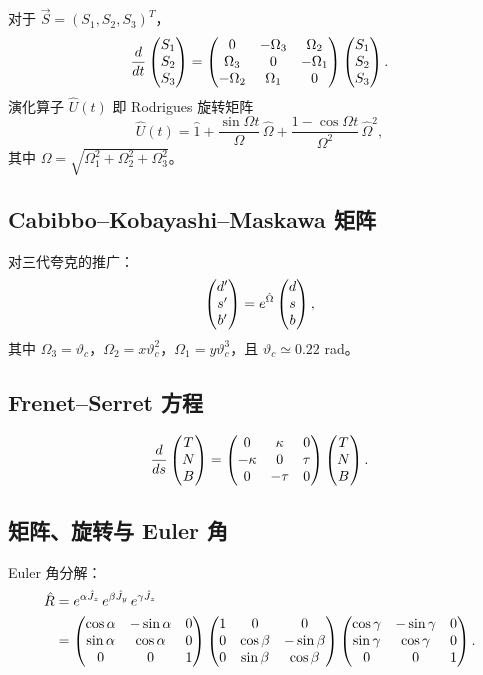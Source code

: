 对于 $\vec{S} = (S_{1},S_{2},S_{3})^{T}$，
\[
\frac{d}{dt}\begin{pmatrix}S_{1}\\S_{2}\\S_{3}\end{pmatrix}
= \begin{pmatrix}0&-\Omega_{3}&\Omega_{2}\\
        \Omega_{3}&0&-\Omega_{1}\\
       -\Omega_{2}&\Omega_{1}&0\end{pmatrix}
  \begin{pmatrix}S_{1}\\S_{2}\\S_{3}\end{pmatrix}.
\]
演化算子 $\hat{U}(t)$ 即 Rodrigues 旋转矩阵
\[
\hat{U}(t) = \hat{1} + \frac{\sin\Omega t}{\Omega}\,\hat{\Omega}
+ \frac{1-\cos\Omega t}{\Omega^{2}}\,\hat{\Omega}^{2},
\]
其中 $\Omega = \sqrt{\Omega_{1}^{2}+\Omega_{2}^{2}+\Omega_{3}^{2}}$。

\subsection{Cabibbo--Kobayashi--Maskawa 矩阵}
\label{sec:1.6.3}

对三代夸克的推广：
\[
\begin{pmatrix}d'\\s'\\b'\end{pmatrix} = e^{\hat{\Omega}}\begin{pmatrix}d\\s\\b\end{pmatrix},
\]
其中 $\Omega_{3}=\vartheta_{c}$，$\Omega_{2}=x\vartheta_{c}^{2}$，$\Omega_{1}=y\vartheta_{c}^{3}$，且 $\vartheta_{c}\simeq 0.22$ rad。

\subsection{Frenet--Serret 方程}
\label{sec:1.6.4}

\[
\frac{d}{ds}\begin{pmatrix}T\\N\\B\end{pmatrix}
= \begin{pmatrix}0&\kappa&0\\-\kappa&0&\tau\\0&-\tau&0\end{pmatrix}
  \begin{pmatrix}T\\N\\B\end{pmatrix}.
\]

\subsection{矩阵、旋转与 Euler 角}
\label{sec:1.6.5}

Euler 角分解：
\begin{align*}
\hat{R}
&= e^{\alpha\hat{J}_{z}}\,e^{\beta\hat{J}_{y}}\,e^{\gamma\hat{J}_{z}} \\
&= \begin{pmatrix}\cos\alpha&-\sin\alpha&0\\\sin\alpha&\cos\alpha&0\\0&0&1\end{pmatrix}
   \begin{pmatrix}1&0&0\\0&\cos\beta&-\sin\beta\\0&\sin\beta&\cos\beta\end{pmatrix}
   \begin{pmatrix}\cos\gamma&-\sin\gamma&0\\\sin\gamma&\cos\gamma&0\\0&0&1\end{pmatrix}.
\end{align*}

